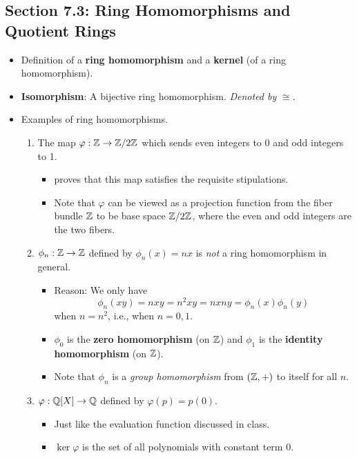 \documentclass[../notes.tex]{subfiles}
\begin{document}
\subsection*{Section 7.3: Ring Homomorphisms and Quotient Rings}
\begin{itemize}
    \item Definition of a \textbf{ring homomorphism} and a \textbf{kernel} (of a ring homomorphism).
    \item \textbf{Isomorphism}: A bijective ring homomorphism. \emph{Denoted by} $\bm{\cong}$.
    \item Examples of ring homomorphisms.
    \begin{enumerate}
        \item The map $\varphi:\mathbb{Z}\to\mathbb{Z}/2\mathbb{Z}$ which sends even integers to 0 and odd integers to 1.
        \begin{itemize}
            \item \textcite{bib:DummitFoote} proves that this map satisfies the requisite stipulations.
            \item Note that $\varphi$ can be viewed as a projection function from the fiber bundle $\mathbb{Z}$ to be base space $\mathbb{Z}/2\mathbb{Z}$, where the even and odd integers are the two fibers.
        \end{itemize}
        \item $\phi_n:\mathbb{Z}\to\mathbb{Z}$ defined by $\phi_n(x)=nx$ is \emph{not} a ring homomorphism in general.
        \begin{itemize}
            \item Reason: We only have
            \begin{equation*}
                \phi_n(xy) = nxy = n^2xy = nxny = \phi_n(x)\phi_n(y)
            \end{equation*}
            when $n=n^2$, i.e., when $n=0,1$.
            \item $\phi_0$ is the \textbf{zero homomorphism} (on $\mathbb{Z}$) and $\phi_1$ is the \textbf{identity homomorphism} (on $\mathbb{Z}$).
            \item Note that $\phi_n$ is a \emph{group homomorphism} from $(\mathbb{Z},+)$ to itself for all $n$.
        \end{itemize}
        \item $\varphi:\mathbb{Q}[X]\to\mathbb{Q}$ defined by $\varphi(p)=p(0)$.
        \begin{itemize}
            \item Just like the evaluation function discussed in class.
            \item $\ker\varphi$ is the set of all polynomials with constant term 0.

\end{itemize}
\end{enumerate}
\end{itemize}
\end{document}
